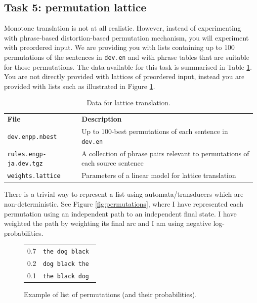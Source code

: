 \subsection{Task 5: permutation lattice}

Monotone translation is not at all realistic. 
However, instead of experimenting with phrase-based distortion-based permutation mechanism, you will experiment with preordered input.
We are providing you with lists containing up to 100 permutations of the sentences in \texttt{dev.en} and with phrase tables that are suitable for those permutations. 
The data available for this task is summarised in Table \ref{tab:data-preordered}.
You are not directly provided with lattices of preordered input, instead you are provided with lists such as illustrated in Figure \ref{fig:n-best}.


\begin{table}\centering
\begin{tabular}{l p{9cm} }
\textbf{File}   & \textbf{Description} \\
\texttt{dev.enpp.nbest} & Up to 100-best permutations of each sentence in \texttt{dev.en} \\
\texttt{rules.engp-ja.dev.tgz}  & A collection of phrase pairs relevant to permutations of each source sentence\\
\texttt{weights.lattice} & Parameters of a linear model for lattice translation \\
\end{tabular}
\caption{\label{tab:data-preordered}Data for lattice translation.}
\end{table}


There is a trivial way to represent a list using automata/transducers which are non-deterministic. See Figure \ref{fig:permutations}, where I have represented each permutation using an independent path to an independent final state. I have weighted the path by weighting its final arc and I am using negative log-probabilities.

\begin{figure}[h]\centering
\begin{tabular}{l l}
0.7 & \texttt{the dog black } \\
0.2 & \texttt{dog black the} \\
0.1 & \texttt{the black dog} \\
\end{tabular}
\caption{\label{fig:n-best}Example of list of permutations (and their probabilities).}
\end{figure}


